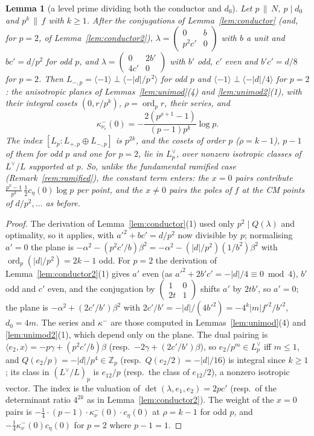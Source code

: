 \documentclass[11pt,reqno]{amsart}
\theoremstyle{plain}
\newtheorem{lemma}[theorem]{Lemma}
\theoremstyle{definition}
\DeclareMathOperator{\ord}{ord}
\newcommand{\Z}{\mathbb{Z}}
\newcommand{\Ldual}{L^{\vee}}
\begin{document}
\begin{lemma}[a level prime dividing both the conductor and $d_0$]\label{lem:ramlevel}
Let $p\,\|\,N$, $p\mid d_0$ and $p^k\,\|\,f$ with $k\ge1$. After the conjugations of
Lemma~\ref{lem:conductor} (and, for $p=2$, of Lemma~\ref{lem:conductor2}), $\lambda=\begin{pmatrix}0&b\\
p^2c'&0\end{pmatrix}$ with $b$ a unit and $bc'=d/p^2$ for odd $p$, and $\lambda=\begin{pmatrix}0&2b'\\4c'
&0\end{pmatrix}$ with $b'$ odd, $c'$ even and $b'c'=d/8$ for $p=2$. Then $L_{-,p}=\langle-1\rangle\perp
\langle-\lvert d\rvert/p^{\,2}\rangle$ for odd $p$ and $\langle-1\rangle\perp\langle-\lvert d\rvert/4\rangle$
for $p=2$: the anisotropic planes of Lemmas~\ref{lem:unimod}(4) and \ref{lem:unimod2}(1), with their
integral cosets $(0,r/p^k)$, $\rho=\ord_pr$, their series, and
\[
  \kappa^-_{\nu_r}(0)=-\frac{2(p^{\rho+1}-1)}{(p-1)p^k}\log p .
\]
The index $[L_p:L_{+,p}\oplus L_{-,p}]$ is $p^{2k}$, and the cosets of order $p$ ($\rho=k-1$), $p-1$
of them for odd $p$ and one for $p=2$, lie in $L_p^\vee$, over nonzero isotropic classes of
$\Ldual/L$ supported at $p$. So, unlike the fundamental ramified case (Remark~\ref{rem:ramified}),
the constant term enters: the $x=0$ pairs contribute $\tfrac{p^k-1}{p^k}\,\tfrac12c_\eta(0)\log p$ per
point, and the $x\ne0$ pairs the poles of $f$ at the CM points of $d/p^2,\dots$ as before.
\end{lemma}
\begin{proof}
The derivation of Lemma~\ref{lem:conductor}(1) used only $p^2\mid Q(\lambda)$ and optimality, so it
applies, with $a'^2+bc'=d/p^2$ now divisible by $p$; normalising $a'=0$ the plane is
$-\alpha^2-(p^2c'/b)\beta^2=-\alpha^2-(\lvert d\rvert/p^2)(1/b^2)\beta^2$ with $\ord_p(\lvert d\rvert/p^2)
=2k-1$ odd. For $p=2$ the derivation of Lemma~\ref{lem:conductor2}(1) gives $a'$ even (as $a'^2+2b'c'
=-\lvert d\rvert/4\equiv0\bmod4$), $b'$ odd and $c'$ even, and the conjugation by $\begin{pmatrix}1&0\\
2t&1\end{pmatrix}$ shifts $a'$ by $2tb'$, so $a'=0$; the plane is $-\alpha^2+(2c'/b')\beta^2$ with
$2c'/b'=-\lvert d\rvert/(4b'^2)=-4^k\lvert m\rvert f'^2/b'^2$, $d_0=4m$. The series and $\kappa^-$ are
those computed in Lemmas~\ref{lem:unimod}(4) and \ref{lem:unimod2}(1), which depend only on the plane.
The dual pairing is $\langle e_2,x\rangle=-p\gamma+(p^2c'/b)\beta$ (resp.\ $-2\gamma+(2c'/b')\beta$),
so $e_2/p^m\in L_p^\vee$ iff $m\le1$, and $Q(e_2/p)=-\lvert d\rvert/p^4\in\Z_p$ (resp.\ $Q(e_2/2)=
-\lvert d\rvert/16$) is integral since $k\ge1$; its class in $(\Ldual/L)_p$ is $e_{12}/p$ (resp.\ the
class of $e_{12}/2$), a nonzero isotropic vector. The index is the valuation of
$\det(\lambda,e_1,e_2)=2pc'$ (resp.\ of the determinant ratio $4^{2k}$ as in Lemma~\ref{lem:conductor2}).
The weight of the $x=0$ pairs is $-\tfrac14\cdot(p-1)\cdot\kappa^-_{\nu}(0)\cdot c_\eta(0)$ at $\rho=k-1$
for odd $p$, and $-\tfrac14\kappa^-_\nu(0)c_\eta(0)$ for $p=2$ where $p-1=1$.
\end{proof}
\end{document}
